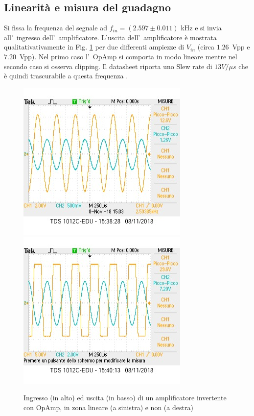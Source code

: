 \documentclass[10pt,a4paper]{article}
\begin{document}
	\subsection{Linearit\`a e misura del guadagno}
	Si fissa la frequenza del segnale ad $f_{in} = (2.597 \pm 0.011)$ kHz e si invia all'~ingresso dell'~amplificatore.	L'uscita dell'~amplificatore \`e mostrata qualitativativamente in Fig. \ref{fig:oscinv} per due 
	differenti ampiezze di $V_{in}$ (circa $1.26$~Vpp e $7.20$~Vpp). 
	Nel primo caso l'~OpAmp si comporta in modo lineare mentre nel secondo caso si osserva clipping. Il datasheet riporta uno Slew rate di $13 V/\mu s$ che è quindi trascurabile a questa frequenza .
	\begin{figure}[h]
		\begin{center}
		
			\includegraphics[scale=0.7]{foto1.jpg}
			\includegraphics[scale=0.7]{foto2.jpg}
			\caption{screenshot dei segnali con e senza clipping}
		\end{center}
		\caption{\small Ingresso (in alto) ed uscita (in basso) di un amplificatore invertente con OpAmp, in 
			zona lineare (a sinistra) e non (a destra)}
		\label{fig:oscinv}
	\end{figure}
	
\end{document}
